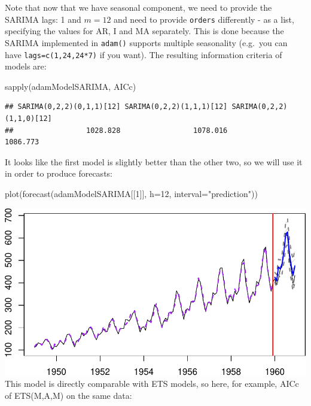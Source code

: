 \documentclass[
]{book}
\newenvironment{Shaded}{\begin{snugshade}}{\end{snugshade}}
\newcommand{\AttributeTok}[1]{\textcolor[rgb]{0.77,0.63,0.00}{#1}}
\newcommand{\DecValTok}[1]{\textcolor[rgb]{0.00,0.00,0.81}{#1}}
\newcommand{\FunctionTok}[1]{\textcolor[rgb]{0.00,0.00,0.00}{#1}}
\newcommand{\NormalTok}[1]{#1}
\newcommand{\StringTok}[1]{\textcolor[rgb]{0.31,0.60,0.02}{#1}}
\theoremstyle{definition}
\theoremstyle{definition}
\theoremstyle{definition}
\theoremstyle{definition}
\theoremstyle{remark}
\begin{document}
Note that now that we have seasonal component, we need to provide the SARIMA lags: 1 and \(m=12\) and need to provide \texttt{orders} differently - as a list, specifying the values for AR, I and MA separately. This is done because the SARIMA implemented in \texttt{adam()} supports multiple seasonality (e.g.~you can have \texttt{lags=c(1,24,24*7)} if you want). The resulting information criteria of models are:

\begin{Shaded}
\begin{Highlighting}[]
\FunctionTok{sapply}\NormalTok{(adamModelSARIMA, AICc)}
\end{Highlighting}
\end{Shaded}

\begin{verbatim}
## SARIMA(0,2,2)(0,1,1)[12] SARIMA(0,2,2)(1,1,1)[12] SARIMA(0,2,2)(1,1,0)[12] 
##                 1028.828                 1078.016                 1086.773
\end{verbatim}

It looks like the first model is slightly better than the other two, so we will use it in order to produce forecasts:

\begin{Shaded}
\begin{Highlighting}[]
\FunctionTok{plot}\NormalTok{(}\FunctionTok{forecast}\NormalTok{(adamModelSARIMA[[}\DecValTok{1}\NormalTok{]], }\AttributeTok{h=}\DecValTok{12}\NormalTok{, }\AttributeTok{interval=}\StringTok{"prediction"}\NormalTok{))}
\end{Highlighting}
\end{Shaded}

\includegraphics{adam_files/figure-latex/adamSARIMAPlotAir-1.pdf}
This model is directly comparable with ETS models, so here, for example, AICc of ETS(M,A,M) on the same data:
\end{document}
